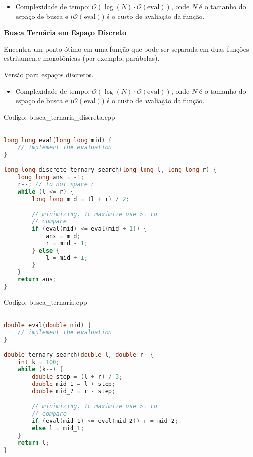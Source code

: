 \documentclass[10pt, a4paper, oneside]{book}
\begin{document}
\begin{itemize}
\item Complexidade de tempo: $\mathcal{O}(\log(N) \cdot \mathcal{O}(\text{eval}))$, onde $N$ é o tamanho do espaço de busca e ($\mathcal{O}(\text{eval})$) é o custo de avaliação da função.
\end{itemize}



\textbf{Busca Ternária em Espaço Discreto} 



Encontra um ponto ótimo em uma função que pode ser separada em duas funções estritamente monotônicas (por exemplo, parábolas).

Versão para espaços discretos.



\begin{itemize}
\item Complexidade de tempo: $\mathcal{O}(\log(N) \cdot \mathcal{O}(\text{eval}))$, onde $N$ é o tamanho do espaço de busca e ($\mathcal{O}(\text{eval})$) é o custo de avaliação da função.
\end{itemize}

\hfill

Codigo: busca\_ternaria\_discreta.cpp

\begin{lstlisting}[language=C++]

long long eval(long long mid) {
    // implement the evaluation
}

long long discrete_ternary_search(long long l, long long r) {
    long long ans = -1;
    r--; // to not space r
    while (l <= r) {
        long long mid = (l + r) / 2;

        // minimizing. To maximize use >= to
        // compare
        if (eval(mid) <= eval(mid + 1)) {
            ans = mid;
            r = mid - 1;
        } else {
            l = mid + 1;
        }
    }
    return ans;
}
\end{lstlisting}
\hfill

Codigo: busca\_ternaria.cpp

\begin{lstlisting}[language=C++]

double eval(double mid) {
    // implement the evaluation
}

double ternary_search(double l, double r) {
    int k = 100;
    while (k--) {
        double step = (l + r) / 3;
        double mid_1 = l + step;
        double mid_2 = r - step;

        // minimizing. To maximize use >= to
        // compare
        if (eval(mid_1) <= eval(mid_2)) r = mid_2;
        else l = mid_1;
    }
    return l;
}
\end{lstlisting}
\hfill
\end{document}

